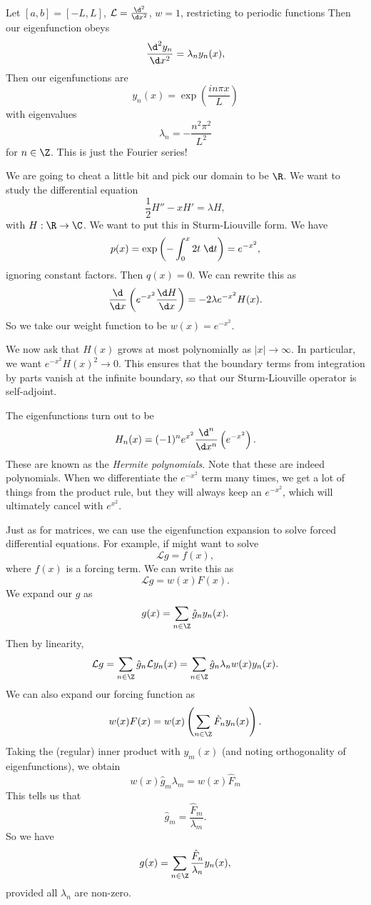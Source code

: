 \documentclass[a4paper]{article}
\begin{document}
\begin{eg}
  Let $[a, b] = [-L, L]$, $\mathcal{L} = \frac{\d^2}{\d x^2}$, $w = 1$, restricting to periodic functions Then our eigenfunction obeys
  \[
    \frac{\d^2 y_n}{\d x^2} = \lambda_n y_n(x),
  \]
  Then our eigenfunctions are
  \[
    y_n(x) = \exp\left(\frac{in\pi x}{L}\right)
  \]
  with eigenvalues
  \[
    \lambda_n = - \frac{n^2 \pi^2}{L^2}
  \]
  for $n \in \Z$. This is just the Fourier series!
\end{eg}

\begin{eg}
  We are going to cheat a little bit and pick our domain to be $\R$. We want to study the differential equation
  \[
    \frac{1}{2}H'' - xH' = \lambda H,
  \]
  with $H: \R \to \C$. We want to put this in Sturm-Liouville form. We have
  \[
    p(x) = \exp\left(-\int_0^x 2t \;\d t\right) = e^{-x^2},
  \]
  ignoring constant factors. Then $q(x) = 0$. We can rewrite this as
  \[
    \frac{\d}{\d x}\left(e^{-x^2}\frac{\d H}{\d x}\right) = -2\lambda e^{-x^2} H(x).
  \]
  So we take our weight function to be $w(x) = e^{-x^2}$.

  We now ask that $H(x)$ grows at most polynomially as $|x| \to \infty$. In particular, we want $e^{-x^2}H(x)^2 \to 0$. This ensures that the boundary terms from integration by parts vanish at the infinite boundary, so that our Sturm-Liouville operator is self-adjoint.

  The eigenfunctions turn out to be
  \[
    H_n(x) = (-1)^n e^{x^2}\frac{\d^n}{\d x^n}\left(e^{-x^2}\right).
  \]
  These are known as the \emph{Hermite polynomials}. Note that these are indeed polynomials. When we differentiate the $e^{-x^2}$ term many times, we get a lot of things from the product rule, but they will always keep an $e^{-x^2}$, which will ultimately cancel with $e^{x^2}$.
\end{eg}

Just as for matrices, we can use the eigenfunction expansion to solve forced differential equations. For example, if might want to solve
\[
  \mathcal{L} g = f(x),
\]
where $f(x)$ is a forcing term. We can write this as
\[
  \mathcal{L} g = w(x) F(x).
\]
We expand our $g$ as
\[
  g(x) = \sum_{n \in \Z}\hat{g}_n y_n(x).
\]
Then by linearity,
\[
  \mathcal{L}g = \sum_{n \in \Z}\hat{g}_n \mathcal{L} y_n(x) = \sum_{n \in \Z}\hat{g}_n \lambda_n w(x)y_n(x).
\]
We can also expand our forcing function as
\[
  w(x) F(x) = w(x) \left(\sum_{n \in \Z}\hat{F}_n y_n(x)\right).
\]
Taking the (regular) inner product with $y_m(x)$ (and noting orthogonality of eigenfunctions), we obtain
\[
  w(x) \hat{g}_m \lambda_m = w(x) \hat{F}_m
\]
This tells us that
\[
  \hat{g}_m = \frac{\hat{F}_m}{\lambda_m}.
\]
So we have
\[
  g(x) = \sum_{n \in \Z}\frac{\hat{F}_n}{\lambda_n}y_n(x),
\]
provided all $\lambda_n$ are non-zero.
\end{document}
